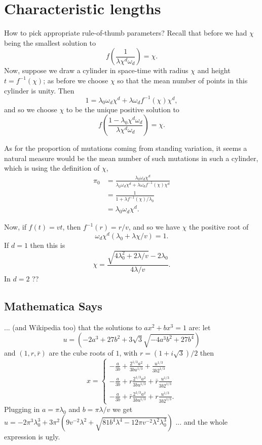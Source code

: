 \documentclass{article}
\begin{document}
\section{Characteristic lengths}

How to pick appropriate rule-of-thumb parameters?
Recall that before we had $\chi$ being the smallest solution to
\[
    f\left( \frac{1}{\lambda \chi^d \omega_d} \right) = \chi.
\]
Now, suppose we draw a cylinder in space-time with radius $\chi$ and height $t=f^{-1}(\chi)$;
as before we choose $\chi$ so that the mean number of points in this cylinder is unity.
Then
\[
    1 = \lambda_0 \omega_d \chi^d + \lambda \omega_d f^{-1}(\chi) \chi^d ,
\]
and so we choose $\chi$ to be the unique positive solution to 
\[
    f\left( \frac{1 - \lambda_0 \chi^d \omega_d}{\lambda \chi^d \omega_d} \right) = \chi.
\]

As for the proportion of mutations coming from standing variation,
it seems a natural measure would be the mean number of such mutations in such a cylinder,
which is using the definition of $\chi$,
\begin{align*}
    \pi_0 &= \frac{\lambda_0 \omega_d \chi^d }{ \lambda_0 \omega_d \chi^d + \lambda \omega_d f^{-1}(\chi) \chi^d} \\
        & = \frac{ 1 }{ 1 + \lambda f^{-1}(\chi) / \lambda_0 } \\
        &= \lambda_0 \omega_d \chi^d .
\end{align*}

Now, if $f(t) = vt$, then $f^{-1}(r) = r/v$,
and so we have $\chi$ the positive root of
\[
  \omega_d \chi^d (\lambda_0 + \lambda \chi/v) = 1 .
\]
If $d=1$ then this is
\[
    \chi = \frac{ \sqrt{ 4 \lambda_0^2 + 2\lambda/v } - 2 \lambda_0 }{ 4 \lambda/v } .
\]
In $d=2$ ??

\subsection{Mathematica Says}

... (and Wikipedia too) that the solutions to $ax^2 + bx^3 = 1$ are:
let 
\[
   u = \left( -2a^3 + 27b^2 + 3 \sqrt{3} \sqrt{ -4a^3b^2+27b^4} \right)
\]
and $(1, r, \bar r)$ are the cube roots of $1$, with $r=(1+i\sqrt{3})/2$ then
\[
    x = \begin{cases} 
        -\frac{a}{3b} + \frac{ 2^{1/3} a^2 }{ 3 b u^{1/3} } + \frac{ u^{1/3} }{ 3 b 2^{1/3} } \\
        -\frac{a}{3b} + r \frac{ 2^{1/3} a^2 }{ 3 b u^{1/3} } + \bar r \frac{ u^{1/3} }{ 3 b 2^{1/3} } \\
        -\frac{a}{3b} + \bar r \frac{ 2^{1/3} a^2 }{ 3 b u^{1/3} } + r \frac{ u^{1/3} }{ 3 b 2^{1/3} }  .
    \end{cases}
\]
Plugging in $a=\pi \lambda_0$ and $b=\pi \lambda/v$ we get
$u = - 2 \pi^3 \lambda_0^3 + 3 \pi^2 \left( 9 v^{-2} \lambda^2 + \sqrt{ 81 b^4 \lambda^4 - 12 \pi v^{-2} \lambda^2 \lambda_0^3 } \right)$
... and the whole expression is ugly.
\end{document}

